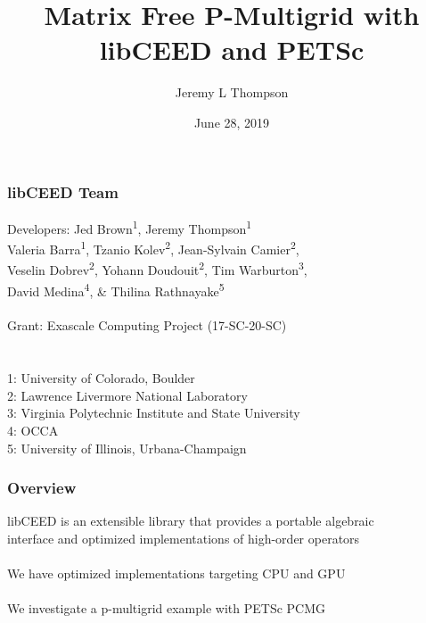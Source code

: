 \documentclass{beamer}
\title[libCEED Finite Element Library]{Matrix Free P-Multigrid with libCEED and PETSc} %
\author{Jeremy L Thompson} %
\institute[CU Boulder] %
{University of Colorado Boulder \\ %
\medskip
\textit{jeremy.thompson@colorado.edu} %
}
\date{June 28, 2019} %
\begin{document}
\begin{frame}
\titlepage %
\end{frame}


\begin{frame}
\begin{center}
\frametitle{libCEED Team}

{\flushleft

Developers: \hspace{2mm} Jed Brown\textsuperscript{1}, Jeremy Thompson\textsuperscript{1} \\
\hspace{23mm} Valeria Barra\textsuperscript{1}, Tzanio Kolev\textsuperscript{2}, Jean-Sylvain Camier\textsuperscript{2},\\
\hspace{23mm} Veselin Dobrev\textsuperscript{2}, Yohann Doudouit\textsuperscript{2}, Tim Warburton\textsuperscript{3},\\
\hspace{23mm} David Medina\textsuperscript{4}, \& Thilina Rathnayake\textsuperscript{5}\\

~\\

Grant: \hspace{11mm} Exascale Computing Project (17-SC-20-SC)\\

~\\

~\\

\small{1: University of Colorado, Boulder\\
2: Lawrence Livermore National Laboratory\\
3: Virginia Polytechnic Institute and State University\\
4: OCCA\\
5: University of Illinois, Urbana-Champaign\\}}

\end{center}
\end{frame}

\begin{frame}
\begin{center}
\frametitle{Overview}

libCEED is an extensible library that provides a portable algebraic\\interface and optimized implementations of high-order operators\\

~\\

We have optimized implementations targeting CPU and GPU\\

~\\

We investigate a p-multigrid example with PETSc PCMG

\end{center}
\end{frame}
 
\end{document}
